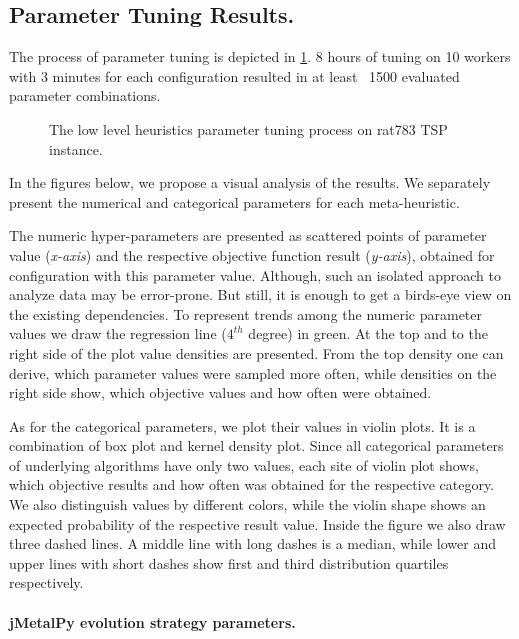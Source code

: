 \subsection{Parameter Tuning Results.} 
The process of parameter tuning is depicted in \cref{eval:pict:mh tuning}. 8 hours of tuning on 10 workers with 3 minutes for each configuration resulted in at least ~1500 evaluated parameter combinations. 

\begin{figure}[h!]
	\centering
	
	\caption{The low level heuristics parameter tuning process on rat783 TSP instance.}
	\label{eval:pict:mh tuning}
\end{figure}

In the figures below, we propose a visual analysis of the results. We separately present the numerical and categorical parameters for each meta-heuristic.

The numeric hyper-parameters are presented as scattered points of parameter value (\emph{x-axis}) and the respective objective function result (\emph{y-axis}), obtained for configuration with this parameter value. Although, such an isolated approach to analyze data may be error-prone. But still, it is enough to get a birds-eye view on the existing dependencies. To represent trends among the numeric parameter values we draw the regression line ($4^{th}$ degree) in green. At the top and to the right side of the plot value densities are presented. From the top density one can derive, which parameter values were sampled more often, while densities on the right side show, which objective values and how often were obtained. 

As for the categorical parameters, we plot their values in violin plots. It is a combination of box plot and kernel density plot. Since all categorical parameters of underlying algorithms have only two values, each site of violin plot shows, which objective results and how often was obtained for the respective category. We also distinguish values by different colors, while the violin shape shows an expected probability of the respective result value. Inside the figure we also draw three dashed lines. A middle line with long dashes is a median, while lower and upper lines with short dashes show first and third distribution quartiles respectively.


\paragraph{jMetalPy evolution strategy parameters.}

